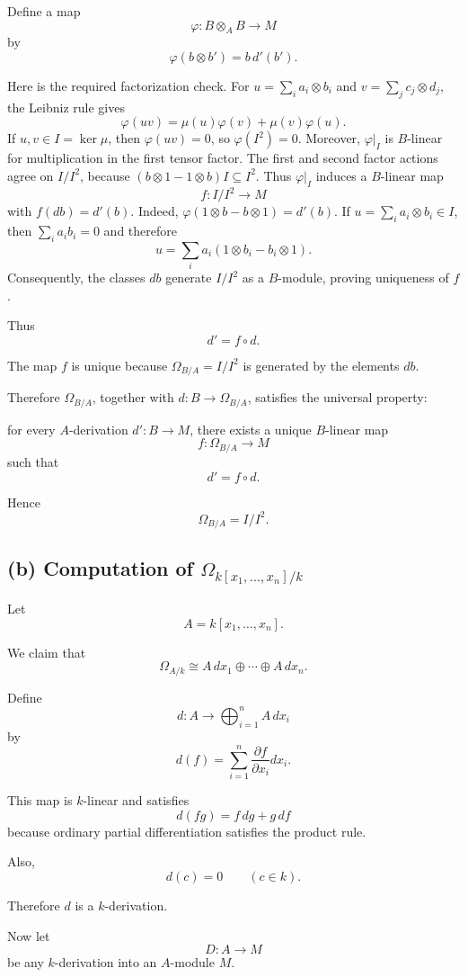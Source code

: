 Define a map
\[
\varphi:B\otimes_A B\to M
\]
by
\[
\varphi(b\otimes b')=b\,d'(b').
\]

Here is the required factorization check. For
$u=\sum_i a_i\otimes b_i$ and $v=\sum_j c_j\otimes d_j$,
the Leibniz rule gives
\[
\varphi(uv)=\mu(u)\varphi(v)+\mu(v)\varphi(u).
\]
If $u,v\in I=\ker\mu$, then $\varphi(uv)=0$, so
$\varphi(I^2)=0$. Moreover, $\varphi|_I$ is $B$-linear
for multiplication in the first tensor factor. The first and
second factor actions agree on $I/I^2$, because
$(b\otimes 1-1\otimes b)I\subseteq I^2$.
Thus $\varphi|_I$ induces a $B$-linear map
\[
f:I/I^2\longrightarrow M
\]
with $f(db)=d'(b)$. Indeed,
$\varphi(1\otimes b-b\otimes1)=d'(b)$.
If $u=\sum_i a_i\otimes b_i\in I$, then
$\sum_i a_i b_i=0$ and therefore
\[
u=\sum_i a_i(1\otimes b_i-b_i\otimes1).
\]
Consequently, the classes $db$ generate $I/I^2$ as a
$B$-module, proving uniqueness of $f$.

Thus
\[
d'=f\circ d.
\]

The map \(f\) is unique because \(\Omega_{B/A}=I/I^2\) is generated by the
elements \(db\).

Therefore \(\Omega_{B/A}\), together with \(d:B\to\Omega_{B/A}\), satisfies
the universal property:

for every \(A\)-derivation \(d':B\to M\), there exists a unique \(B\)-linear
map
\[
f:\Omega_{B/A}\to M
\]
such that
\[
d'=f\circ d.
\]

Hence
\[
\boxed{
	\Omega_{B/A}=I/I^2.
}
\]

\subsection*{(b) Computation of \(\Omega_{k[x_1,\ldots,x_n]/k}\)}

Let
\[
A=k[x_1,\ldots,x_n].
\]

We claim that
\[
\Omega_{A/k}
\cong
A\,dx_1\oplus\cdots\oplus A\,dx_n.
\]

Define
\[
d:A\to \bigoplus_{i=1}^n A\,dx_i
\]
by
\[
d(f)=\sum_{i=1}^n
\frac{\partial f}{\partial x_i}dx_i.
\]

This map is \(k\)-linear and satisfies
\[
d(fg)=f\,dg+g\,df
\]
because ordinary partial differentiation satisfies the product rule.

Also,
\[
d(c)=0
\qquad
(c\in k).
\]

Therefore \(d\) is a \(k\)-derivation.

Now let
\[
D:A\to M
\]
be any \(k\)-derivation into an \(A\)-module \(M\).

